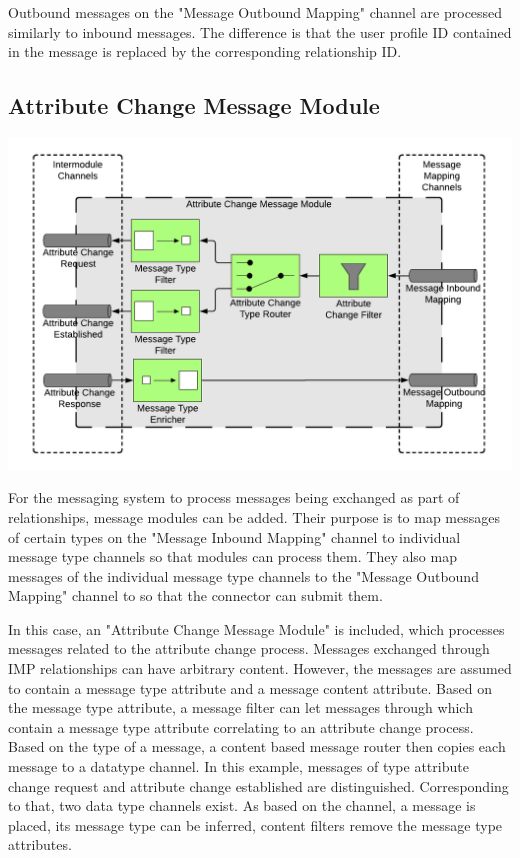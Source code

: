 Outbound messages on the "Message Outbound Mapping" channel are processed similarly to inbound messages. The difference is that the user profile ID contained in the message is replaced by the corresponding relationship ID.

\subsection{Attribute Change Message Module}

\begin{center}
    \includegraphics[scale=0.6]{Diagrams/Integration Architecture 1/Technological Integration/11. Attribute Change Message Module.pdf}
\end{center}

For the messaging system to process messages being exchanged as part of relationships, message modules can be added. Their purpose is to map messages of certain types on the "Message Inbound Mapping" channel to individual message type channels so that modules can process them. They also map messages of the individual message type channels to the "Message Outbound Mapping" channel to so that the connector can submit them.

In this case, an "Attribute Change Message Module" is included, which processes messages related to the attribute change process. Messages exchanged through IMP relationships can have arbitrary content. However, the messages are assumed to contain a message type attribute and a message content attribute. Based on the message type attribute, a message filter can let messages through which contain a message type attribute correlating to an attribute change process. Based on the type of a message, a content based message router then copies each message to a datatype channel. In this example, messages of type attribute change request and attribute change established are distinguished. Corresponding to that, two data type channels exist. As based on the channel, a message is placed, its message type can be inferred, content filters remove the message type attributes.

